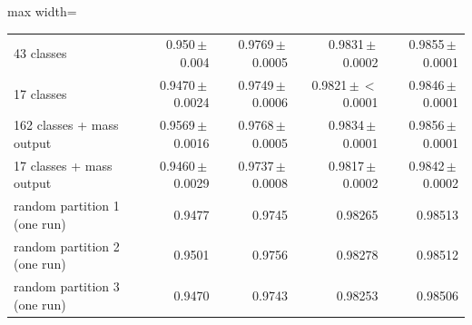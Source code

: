 \begin{table}[t]
\begin{adjustbox}{max width=\linewidth}
\begin{tabular}{l rrrr}
43 classes & 0.950\,$\pm$\,0.004 & 0.9769\,$\pm$\,0.0005 & 0.9831\,$\pm$\,0.0002 & 0.9855\,$\pm$\,0.0001 \\
17 classes & 0.9470\,$\pm$\,0.0024 & 0.9749\,$\pm$\,0.0006 & 0.9821\,$\pm$\,$<$0.0001 & 0.9846\,$\pm$\,0.0001 \\
162 classes + mass output & 0.9569\,$\pm$\,0.0016 & 0.9768\,$\pm$\,0.0005 & 0.9834\,$\pm$\,0.0001 & 0.9856\,$\pm$\,0.0001 \\
17 classes + mass output & 0.9460\,$\pm$\,0.0029 & 0.9737\,$\pm$\,0.0008 & 0.9817\,$\pm$\,0.0002 & 0.9842\,$\pm$\,0.0002 \\
random partition 1 (one run) & 0.9477 & 0.9745 & 0.98265 & 0.98513 \\
random partition 2 (one run) & 0.9501 & 0.9756 & 0.98278 & 0.98512 \\
random partition 3 (one run) & 0.9470 & 0.9743 & 0.98253 & 0.98506 \\
\bottomrule
\end{tabular}
\end{adjustbox}
\end{table}
